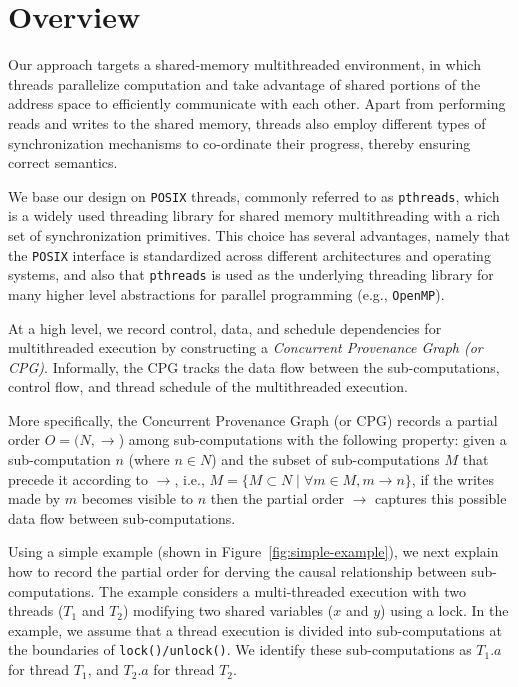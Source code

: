 \section{Overview}
\label{sec:overview}

Our approach targets a shared-memory multithreaded environment, in which threads parallelize computation and take 
advantage of shared portions of the address space to efficiently communicate with each other. Apart from performing reads 
and writes to the shared memory, threads also employ different types of synchronization mechanisms to 
co-ordinate their progress, thereby ensuring correct semantics. 

We base our design on {\tt POSIX} threads, commonly referred to as
{\tt pthreads}, which is a widely used threading library for shared memory
multithreading with a rich set of synchronization primitives.  This
choice has several advantages, namely that the {\tt POSIX} interface
is standardized across different architectures and operating systems, and also that {\tt pthreads} is used as the underlying threading
library for many higher level abstractions for parallel programming
(e.g., {\tt OpenMP}).

 At a high level, we record control, data, and schedule dependencies for multithreaded execution by constructing a {\em Concurrent Provenance Graph (or CPG)}. Informally, the CPG tracks the data flow between the sub-computations, control flow, and thread schedule  of the multithreaded execution.

More specifically, the Concurrent Provenance Graph (or CPG) records a partial order $O = (N, \rightarrow$) among sub-computations with the following property: given a sub-computation $n$ (where $n \in N $)  and the subset of sub-computations $M$ that precede it according to $\rightarrow$, i.e., $M = \{M \subset N \mid \forall m \in M, m \rightarrow n\}$, if the writes made by $m$ becomes visible to $n$ then the partial order $\rightarrow$ captures this possible data flow between sub-computations.




 Using a simple example (shown in Figure~\ref{fig:simple-example}), we next explain how to record  the partial order for derving the causal relationship between sub-computations. The example considers a multi-threaded execution with two threads ($T_1$ and $T_2$) modifying two shared variables ($x$ and $y$) using a lock. In the example, we assume that a thread execution is divided into sub-computations at the boundaries of {\tt lock()/unlock()}. We identify these sub-computations as $T_1.a$ for thread $T_1$, and $T_2.a$ for thread $T_2$.  

